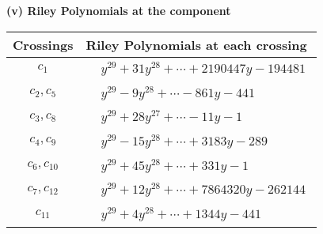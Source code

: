 \documentclass[1p]{elsarticle_modified}
\theoremstyle{definition}
\begin{document}
\flushleft \textbf{(v) Riley Polynomials at the component}\newline \\
\begin{tabular}{m{50pt}|m{274pt}}
Crossings & \hspace{64pt}Riley Polynomials at each crossing \\
\hline $$\begin{aligned}c_{1}\end{aligned}$$&$\begin{aligned}
&y^{29}+31 y^{28}+\cdots+2190447 y-194481
\end{aligned}$\\
\hline $$\begin{aligned}c_{2},c_{5}\end{aligned}$$&$\begin{aligned}
&y^{29}-9 y^{28}+\cdots-861 y-441
\end{aligned}$\\
\hline $$\begin{aligned}c_{3},c_{8}\end{aligned}$$&$\begin{aligned}
&y^{29}+28 y^{27}+\cdots-11 y-1
\end{aligned}$\\
\hline $$\begin{aligned}c_{4},c_{9}\end{aligned}$$&$\begin{aligned}
&y^{29}-15 y^{28}+\cdots+3183 y-289
\end{aligned}$\\
\hline $$\begin{aligned}c_{6},c_{10}\end{aligned}$$&$\begin{aligned}
&y^{29}+45 y^{28}+\cdots+331 y-1
\end{aligned}$\\
\hline $$\begin{aligned}c_{7},c_{12}\end{aligned}$$&$\begin{aligned}
&y^{29}+12 y^{28}+\cdots+7864320 y-262144
\end{aligned}$\\
\hline $$\begin{aligned}c_{11}\end{aligned}$$&$\begin{aligned}
&y^{29}+4 y^{28}+\cdots+1344 y-441
\end{aligned}$\\
\hline
\end{tabular}\\~\\
\end{document}
